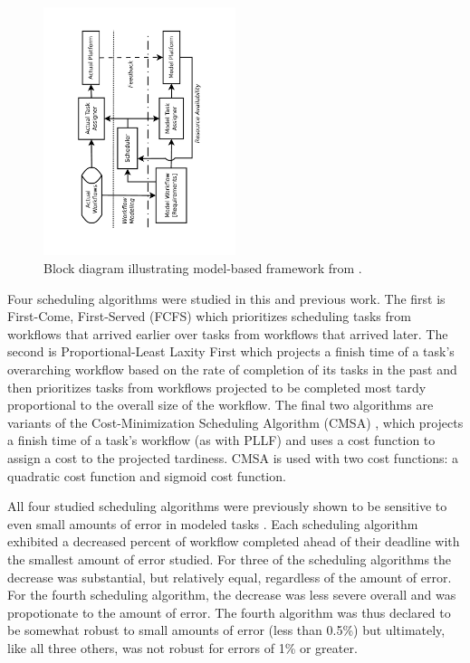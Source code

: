 \documentclass[10pt]{csce}
\begin{document}
\begin{figure}
	\begin{center}
		\includegraphics[angle=-90,width=0.5\textwidth]{figures/PlatformDiagram.pdf}
	\end{center}
	\caption{Block diagram illustrating model-based framework from
		\cite{pdpta18}.}
	\label{fig:platform}
\end{figure}

Four scheduling algorithms were studied in this and previous work. The first
is First-Come, First-Served (FCFS) which prioritizes scheduling tasks from
workflows that arrived earlier over tasks from workflows that arrived later.
The second is Proportional-Least Laxity First which projects a finish time
of a task's overarching workflow based on the rate of completion of its tasks
in the past and then prioritizes tasks from workflows projected to be
completed most tardy proportional to the overall size of the workflow. The
final two algorithms are variants of the Cost-Minimization Scheduling Algorithm
(CMSA) \cite{costmin}, which projects a finish time of a task's workflow (as
with PLLF) and uses a cost function to assign a cost to the projected
tardiness. CMSA is used with two cost functions: a quadratic cost function and
sigmoid cost function.

All four studied scheduling algorithms were previously shown to be sensitive to
even small amounts of error in modeled tasks \cite{pdpta18}.  Each scheduling
algorithm exhibited a decreased percent of workflow completed ahead of their
deadline with the smallest amount of error studied.  For three of the
scheduling algorithms the decrease was substantial, but relatively equal,
regardless of the amount of error.  For the fourth scheduling algorithm, the
decrease was less severe overall and was propotionate to the amount of error.
The fourth algorithm was thus declared to be somewhat robust to small amounts
of error (less than 0.5\%) but ultimately, like all three others, was not
robust for errors of 1\% or greater.
\end{document}
